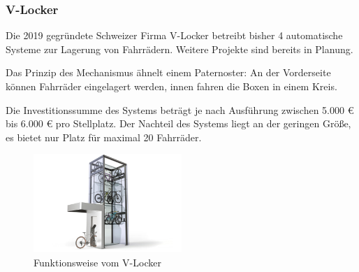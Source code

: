 \subsubsection{V-Locker}
Die 2019 gegründete Schweizer Firma V-Locker betreibt bisher 4 automatische Systeme zur Lagerung von Fahrrädern.  Weitere Projekte sind bereits in Planung. 

\noindent Das Prinzip des Mechanismus ähnelt einem Paternoster: An der Vorderseite können Fahrräder eingelagert werden, innen fahren die Boxen in einem Kreis.

\noindent Die Investitionssumme des Systems beträgt je nach Ausführung zwischen 5.000 \euro{}  bis 6.000 \euro{}  pro Stellplatz.  Der Nachteil des Systems liegt an der geringen Größe, es bietet nur Platz für maximal 20 Fahrräder.

\begin{figure}[H]
    \centering
    \includegraphics[width=0.5\textwidth]{images/vlocker.png}
    \caption{Funktionsweise vom V-Locker }
    \label{fig:vlocker}
\end{figure}
